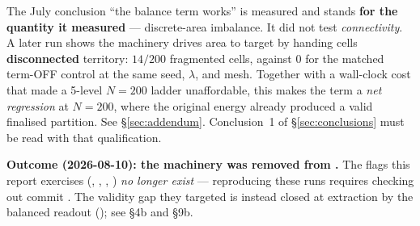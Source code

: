 \documentclass[11pt,a4paper]{article}
\begin{document}
\begin{tcolorbox}[colback=red!5!white, colframe=red!60!black,
                  title={Addendum 2026-08-03 --- Result~1 is confirmed only on
                  \emph{area}; the term causes a \emph{connectivity} regression},
                  fontupper=\small]
The July conclusion ``the balance term works'' is measured and stands \textbf{for
the quantity it measured} --- discrete-area imbalance. It did not test
\emph{connectivity}. A later run shows the machinery drives area to target by
handing cells \textbf{disconnected} territory: \(14/200\) fragmented cells, against
\(0\) for the matched term-OFF control at the same seed, \(\lambda\), and mesh.
Together with a wall-clock cost that made a 5-level \(N{=}200\) ladder
unaffordable, this makes the term a \emph{net regression} at \(N{=}200\), where the
original energy already produced a valid finalised partition. See
\S\ref{sec:addendum}. Conclusion~1 of \S\ref{sec:conclusions} must be read with
that qualification.

\medskip
\textbf{Outcome (2026-08-10): the machinery was removed from .} The
flags this report exercises (,
, , )
\emph{no longer exist} --- reproducing these runs requires checking out commit
. The validity gap they targeted is instead closed at extraction by
the balanced readout (); see
 \S4b and \S9b.
\end{tcolorbox}
\end{document}
